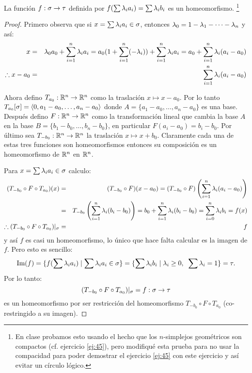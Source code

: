 \begin{ejercicio}\label{ej:46}
  La funci\'on $f:\sigma\rightarrow\tau$ definida por $f(\sum\lambda_ia_i)=\sum\lambda_ib_i$ es un homeomorfismo.%
  \footnote{En clase probamos esto usando el hecho que los $n$-simplejos geom\'etricos son compactos
    (cf. ejercicio \ref{ej:45}), pero modifiqu\'e esta prueba para no usar la compacidad para poder
    demostrar el ejercicio \ref{ej:45} con este ejercicio y as\'i evitar un c\'irculo l\'ogico.}
\end{ejercicio}
\begin{proof}%
  Primero observa que si $x=\sum\lambda_ia_i\in\sigma$, entonces $\lambda_0=1-\lambda_1-\cdots-\lambda_n$ y as\'i:
  \begin{eqnarray*}
    x&=&
    \lambda_0a_0+\sum_{i=1}^n\lambda_ia_i=
      a_0(1+\sum_{i=1}^n(-\lambda_i))+\sum_{i=1}^n\lambda_ia_i=
      a_0+\sum_{i=1}^n\lambda_i(a_i-a_0)\\
    \therefore x-a_0 &=& \sum_{i=1}^n\lambda_i(a_i-a_0)
  \end{eqnarray*}
  
  Ahora defino $T_{a_0}:\mathbb{R}^{n}\rightarrow\mathbb{R}^{n}$ como la traslaci\'on $x\mapsto x-a_0$. Por lo tanto
  $T_{a_0}[\sigma]=\langle 0,a_1-a_0,\ldots,a_n-a_0 \rangle$ donde $A=\{a_1-a_0,\ldots,a_n-a_0\}$ es una base.
  Despu\'es defino $F:\mathbb{R}^n\rightarrow\mathbb{R}^n$ como la transformaci\'on lineal que cambia la base $A$ en la
  base $B=\{b_1-b_0,\ldots,b_n-b_0\}$, en particular $F(a_i-a_0)=b_i-b_0$. Por \'ultimo sea
  $T_{-b_0}:\mathbb{R}^n\rightarrow\mathbb{R}^n$ la traslaci\'on $x\mapsto x+b_0$. Claramente cada una de estas tres funciones
  son homeomorfismos entonces su composici\'on es un homeomorfismo de $\mathbb{R}^{n}$ en $\mathbb{R}^n$.

  Para $x=\sum\lambda_ia_i\in\sigma$ calculo:
  \begin{eqnarray*}
    (T_{-b_0}\circ F\circ T_{a_0})(x)&=&
    (T_{-b_0}\circ F)(x-a_0)=
    (T_{-b_0}\circ F)\left( \sum_{i=1}^n\lambda_i(a_i-a_0) \right)\\ &=&
    T_{-b_0}\left( \sum_{i=1}^n\lambda_i(b_i-b_0) \right)=
    b_0+\sum_{i=1}^n\lambda_i(b_i-b_0)=
    \sum_{i=0}^n\lambda_ib_i=f(x)\\
    \therefore (T_{-b_0}\circ F\circ T_{a_0})|_{\sigma}&=&f
  \end{eqnarray*}
  y as\'i $f$ es casi un homeomorfismo, lo \'unico que hace falta calcular es la imagen de
  $f$. Pero esto es sencillo:
  \[
    \text{Im}(f)=
    \{f(\sum\lambda_ia_i)\mid \sum\lambda_ia_i\in\sigma\}=
    \{\sum \lambda_ib_i\mid \lambda_i\geq 0,\;\; \sum\lambda_i=1\}=
    \tau.
  \]
  Por lo tanto:
  \[
    (T_{-b_0}\circ F\circ T_{a_0})|_{\sigma}=f:\sigma\rightarrow\tau
  \]
  es un homeomorfismo por ser restricci\'on del homeomorfismo $T_{-b_0}\circ F\circ T_{a_0}$
  (co-restringido a su imagen).
\end{proof}%

